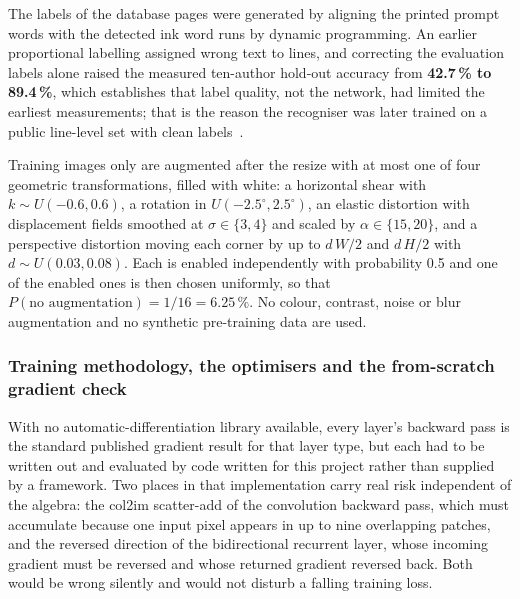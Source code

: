 The labels of the database pages were generated by aligning the printed prompt words with the detected ink word runs by dynamic programming. An earlier proportional labelling assigned wrong text to lines, and correcting the evaluation labels alone raised the measured ten-author hold-out accuracy from \textbf{42.7\,\% to 89.4\,\%}, which establishes that label quality, not the network, had limited the earliest measurements; that is the reason the recogniser was later trained on a public line-level set with clean labels~\cite{mamun2024}.

Training images only are augmented after the resize with at most one of four geometric transformations, filled with white: a horizontal shear with $k\sim U(-0.6,0.6)$, a rotation in $U(-2.5^\circ,2.5^\circ)$, an elastic distortion with displacement fields smoothed at $\sigma\in\{3,4\}$ and scaled by $\alpha\in\{15,20\}$, and a perspective distortion moving each corner by up to $d\,W/2$ and $d\,H/2$ with $d\sim U(0.03,0.08)$. Each is enabled independently with probability 0.5 and one of the enabled ones is then chosen uniformly, so that $P(\text{no augmentation})=1/16=6.25\,\%$. No colour, contrast, noise or blur augmentation and no synthetic pre-training data are used.

\subsubsection{Training methodology, the optimisers and the from-scratch gradient check}
\label{sec:textrec-numpynn}

With no automatic-differentiation library available, every layer's backward pass is the standard published gradient result for that layer type, but each had to be written out and evaluated by code written for this project rather than supplied by a framework. Two places in that implementation carry real risk independent of the algebra: the col2im scatter-add of the convolution backward pass, which must accumulate because one input pixel appears in up to nine overlapping patches, and the reversed direction of the bidirectional recurrent layer, whose incoming gradient must be reversed and whose returned gradient reversed back. Both would be wrong silently and would not disturb a falling training loss.

